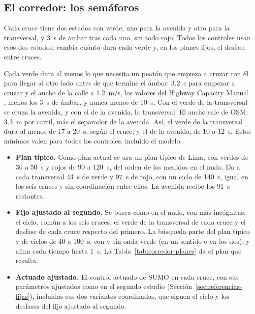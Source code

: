 \subsection*{El corredor: los semáforos}

Cada cruce tiene dos estados
con verde, uno para la avenida y otro para la transversal, y 3~s de
ámbar tras cada uno, sin todo rojo. Todos los controles usan esos dos
estados: cambia cuánto dura cada verde y, en los planes fijos, el
desfase entre cruces.

Cada verde dura al menos lo que necesita un peatón que empieza a cruzar
con él para llegar al otro lado antes de que termine el ámbar: 3.2~s
para empezar a cruzar y el ancho de la calle a 1.2~m/s, los valores del
Highway Capacity Manual \citep{TRB2000_HCM}, menos los 3~s de ámbar, y
nunca menos de 10~s. Con el verde de la transversal se cruza la avenida,
y con el de la avenida, la transversal. El ancho sale de OSM: 3.3~m por
carril, más el separador de la avenida. Así, el verde de la transversal
dura al menos de 17 a 20~s, según el cruce, y el de la avenida, de 10 a
12~s. Estos mínimos valen para todos los controles, incluido el modelo.
\begin{itemize}
  \item \textbf{Plan típico.} Como plan actual se usa un plan típico de
    Lima, con verdes de 30 a 50~s y rojos de 90 a 120~s, del orden de los
    medidos en el nudo. Da a cada transversal 43~s de verde y 97~s de
    rojo, con un ciclo de 140~s, igual en los seis cruces y sin
    coordinación entre ellos. La avenida recibe los 91~s restantes.
  \item \textbf{Fijo ajustado al segundo.} Se busca como en el nudo, con
    más incógnitas: el ciclo, común a los seis cruces, el verde de la
    transversal de cada cruce y el desfase de cada cruce respecto del
    primero. La búsqueda parte del plan típico y de ciclos de 40 a
    100~s, con y sin onda verde (en un sentido o en los dos), y afina
    cada tiempo hasta 1~s. La Tabla~\ref{tab:corredor-planes} da el plan
    que resulta.
  \item \textbf{Actuado ajustado.} El control actuado de SUMO en cada
    cruce, con sus parámetros ajustados como en el segundo estudio
    (Sección~\ref{sec:referencias-fijas}), incluidas sus dos variantes
    coordinadas, que siguen el ciclo y los desfases del fijo ajustado al
    segundo.
\end{itemize}
